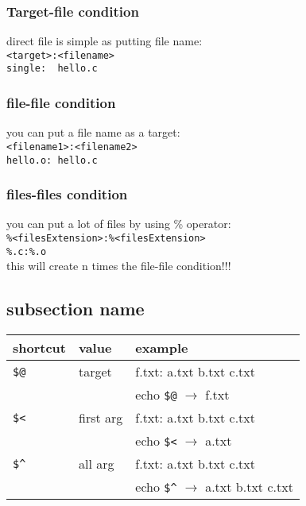 \documentclass[12pt]{article}
\begin{document}
\subsubsection{Target-file condition}
direct file is simple as putting file name: \\
\verb|<target>:<filename>|\\
\verb|single:  hello.c|
\subsubsection{file-file condition}
you can put a file name as a target:\\
\verb|<filename1>:<filename2>|\\
\verb|hello.o: hello.c|
\subsubsection{files-files condition}
you can put a lot of files by using \% operator:\\
\verb|%<filesExtension>:%<filesExtension>|\\
\verb|%.c:%.o|\\
this will create n times the file-file condition!!!
\subsection{subsection name}

\begin{tabular}{|l|l|l|}
  \hline
  shortcut                & value     & example                                                      \\
  \hline
  \verb|$@| & target    & f.txt: a.txt b.txt c.txt                                     \\
                          &           & echo \verb|$@| $\rightarrow$ f.txt             \\ \hline
  \verb|$<| & first arg & f.txt: a.txt b.txt c.txt                                     \\
                          &           & echo \verb|$<| $\rightarrow$  a.txt            \\ \hline
  \verb|$^| & all arg   & f.txt: a.txt b.txt c.txt                                     \\
                          &           & echo \verb|$^| $\rightarrow$ a.txt b.txt c.txt \\ \hline
\end{tabular}
\end{document}
